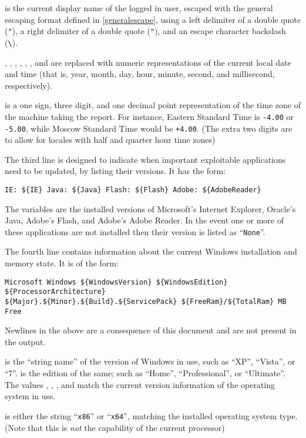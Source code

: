  is the current display name of the logged in user, escaped with
the general escaping format defined in \ref{generalescape}, using a left
delimiter of a double quote (\verb|"|), a right delimiter of a double
quote (\verb|"|), and an escape character backslash (\verb|\|).

, , , , , , and  are
replaced with numeric representations of the current local date and time (that
is, year, month, day, hour, minute, second, and millisecond, respectively).

 is a one sign, three digit, and one decimal point representation
of the time zone of the machine taking the report. For instance, Eastern
Standard Time is \verb|-4.00| or \verb|-5.00|, while Moscow Standard Time would
be \verb|+4.00|. (The extra two digits are to allow for locales with half and
quarter hour time zones)

The third line is designed to indicate when important exploitable applications
need to be updated, by listing their versions. It has the form:
\begin{verbatim}
IE: ${IE} Java: ${Java} Flash: ${Flash} Adobe: ${AdobeReader}
\end{verbatim}

The variables are the installed versions of Microsoft's Internet Explorer,
Oracle's Java, Adobe's Flash, and Adobe's Adobe Reader. In the event one or more
of these applications are not installed then their version is listed as
``\verb|None|''.

The fourth line contains information about the current Windows installation and
memory state. It is of the form:
\begin{verbatim}
Microsoft Windows ${WindowsVersion} ${WindowsEdition} ${ProcessorArchitecture}
${Major}.${Minor}.${Build}.${ServicePack} ${FreeRam}/${TotalRam} MB Free
\end{verbatim}

Newlines in the above are a consequence of this document and are not present in
the output.

 is the ``string name'' of the version of Windows in use,
such as ``XP'', ``Vista'', or ``7''.  is the edition of the
same; such as ``Home'', ``Professional'', or ``Ultimate''. The values
, , , and  match the current
version information of the operating system in use.

 is either the string ``\verb|x86|'' or
``\verb|x64|'', matching the installed operating system type. (Note that this is
\textit{not} the capability of the current processor)

